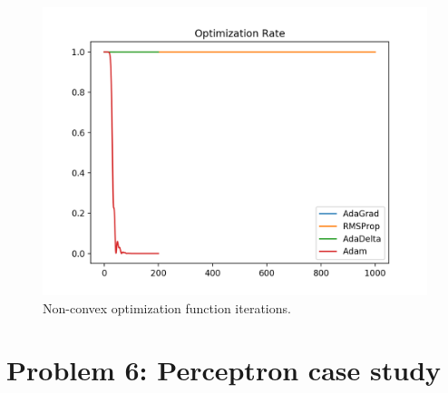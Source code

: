 \documentclass[twoside,11pt]{homework}
\DeclarePairedDelimiter{\2norm}{\lVert}{\rVert^2_2}
\newcommand{\1}[1]{\mathds{1}\left[#1\right]}
\begin{document}
\begin{enumerate}[\bf (i)]
\begin{enumerate}
       \begin{figure}[h!]
         \centering
         \includegraphics[width=6in]{img/hard3.png}
         \caption{Non-convex optimization function iterations.}
         \label{fig:sgdm3}
       \end{figure}
       
    \end{enumerate}

\end{enumerate}

\FloatBarrier

\section*{Problem 6: Perceptron case study}
\end{document}
